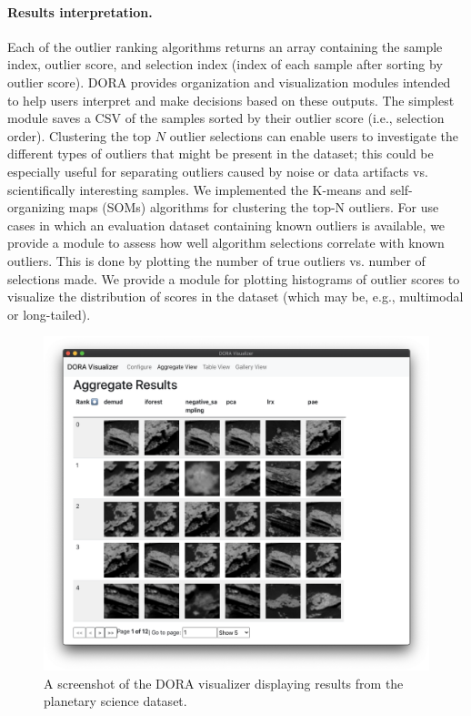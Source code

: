 \documentclass[letterpaper]{article} %
\begin{document}
\paragraph{Results interpretation.}
Each of the outlier ranking algorithms returns an array containing the sample
index, outlier score, and selection index (index of each sample after sorting
by outlier score). DORA provides organization and visualization modules
intended to help users interpret and make decisions based on these outputs.
The simplest
 module saves a CSV of the samples sorted by their outlier score 
 (i.e., selection order). Clustering the top
  $N$ outlier selections can enable users to investigate the different types of 
 outliers that might be present in the dataset; this could be especially useful
 for separating outliers caused by noise or data artifacts vs. scientifically 
 interesting samples. We implemented the K-means and self-organizing maps 
 (SOMs) algorithms for clustering the top-N outliers. For use cases in which an
 evaluation dataset containing known outliers is available, we provide a module
 to assess how well algorithm selections correlate with known outliers. This is
 done by plotting the number of true outliers vs. number of selections made. 
We provide a module for plotting histograms of outlier scores to visualize the
 distribution of scores in the dataset (which may be, e.g., multimodal or 
 long-tailed).

\begin{figure}
  \centering
  \includegraphics[width=0.9\linewidth]{figures/doravis.png}
  \caption{A screenshot of the DORA visualizer displaying results from the
  planetary science dataset.}
  \label{fig:doravis}
\end{figure}
\end{document}

